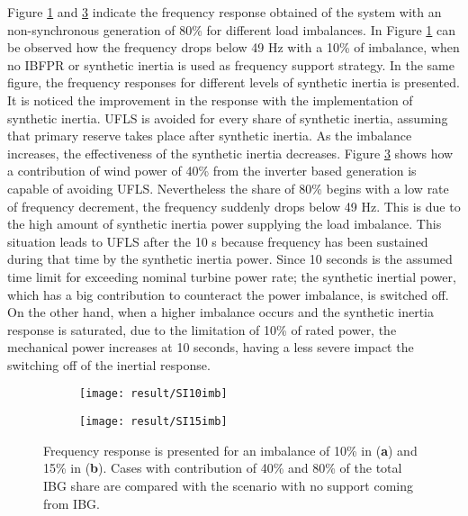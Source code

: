 Figure \ref{fig:res_ieee_fr10imb} and \ref{fig:res_ieee_fr15imb} indicate the frequency response obtained of the system with an non-synchronous generation of 80\% for different load imbalances.  
In Figure \ref{fig:res_ieee_fr10imb} can be observed how the frequency drops below 49 Hz with a 10\% of imbalance, when no IBFPR or synthetic inertia is used as frequency support strategy. In the same figure, the frequency responses for different levels of synthetic inertia is presented. It is noticed the improvement in the response with the implementation of synthetic inertia. UFLS is avoided for every share of synthetic inertia, assuming that primary reserve takes place after synthetic inertia. As the imbalance increases, the effectiveness of the synthetic inertia decreases. Figure \ref{fig:res_ieee_fr15imb} shows how a contribution of wind power of 40\% from the inverter based generation is capable of avoiding UFLS. Nevertheless the share of 80\% begins with a low rate of frequency decrement, the frequency suddenly drops below 49 Hz. This is due to the high amount of synthetic inertia power supplying the load imbalance. This situation leads to UFLS after the 10 s because frequency has been sustained during that time by the synthetic inertia power. Since 10 seconds is the assumed time limit for exceeding nominal turbine power rate; the synthetic inertial power, which has a big contribution to counteract the power imbalance, is switched off. On the other hand, when a higher imbalance occurs and the synthetic inertia response is saturated, due to the limitation of 10\% of rated power, the mechanical power increases at 10 seconds, having a less severe impact the switching off of the inertial response.

\begin{figure}[h]
	\centering
	\begin{subfigure}[h]{0.49\textwidth}
		\centering
		\texttt{[image: result/SI10imb]}
		\caption{}
		\label{fig:res_ieee_fr10imb}
	\end{subfigure}
	\hfill
	\begin{subfigure}[h]{0.49\textwidth}
		\centering
		\texttt{[image: result/SI15imb]}
		\caption{}
		\label{fig:res_ieee_fr15imb}
	\end{subfigure}
	\caption{Frequency response is presented for an imbalance of 10\% in (\textbf{a}) and 15\% in (\textbf{b}). Cases with contribution of 40\% and 80\% of the total IBG share are compared with the scenario with no support coming from IBG.}
\end{figure}


